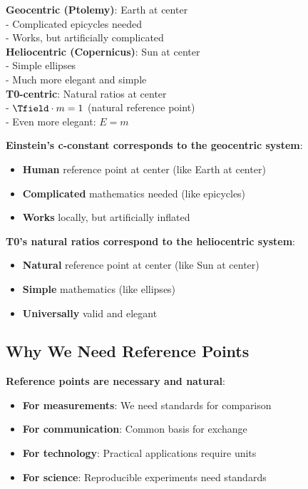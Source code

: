 	\begin{tcolorbox}[colback=blue!5!white,colframe=blue!75!black,title=The Reference Point Revolution: From Earth $\rightarrow$ Sun $\rightarrow$ Nature]
		\textbf{Geocentric (Ptolemy)}: Earth at center \\
		- Complicated epicycles needed \\
		- Works, but artificially complicated \\
		
		\textbf{Heliocentric (Copernicus)}: Sun at center \\
		- Simple ellipses \\
		- Much more elegant and simple \\
		
		\textbf{T0-centric}: Natural ratios at center \\
		- $\Tfield \cdot m = 1$ (natural reference point) \\
		- Even more elegant: $E = m$
	\end{tcolorbox}
	
	\textbf{Einstein's c-constant corresponds to the geocentric system}:
	\begin{itemize}
		\item \textbf{Human} reference point at center (like Earth at center)
		\item \textbf{Complicated} mathematics needed (like epicycles)
		\item \textbf{Works} locally, but artificially inflated
	\end{itemize}
	
	\textbf{T0's natural ratios correspond to the heliocentric system}:
	\begin{itemize}
		\item \textbf{Natural} reference point at center (like Sun at center)
		\item \textbf{Simple} mathematics (like ellipses)
		\item \textbf{Universally} valid and elegant
	\end{itemize}
	
	\subsection{Why We Need Reference Points}
	
	\textbf{Reference points are necessary and natural}:
	\begin{itemize}
		\item \textbf{For measurements}: We need standards for comparison
		\item \textbf{For communication}: Common basis for exchange
		\item \textbf{For technology}: Practical applications require units
		\item \textbf{For science}: Reproducible experiments need standards
	\end{itemize}
	
